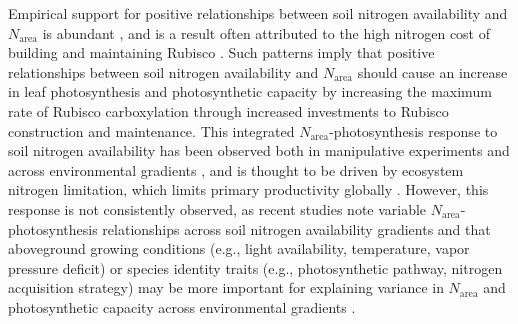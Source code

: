 Empirical support for positive relationships between soil nitrogen availability and $N_\mathrm{area}$ is abundant , and is a result often attributed to the high nitrogen cost of building and maintaining Rubisco . Such patterns imply that positive relationships between soil nitrogen availability and $N_\mathrm{area}$ should cause an increase in leaf photosynthesis and photosynthetic capacity by increasing the maximum rate of Rubisco carboxylation through increased investments to Rubisco construction and maintenance. This integrated $N_\mathrm{area}$-photosynthesis response to soil nitrogen availability has been observed both in manipulative experiments and across environmental gradients , and is thought to be driven by ecosystem nitrogen limitation, which limits primary productivity globally . However, this response is not consistently observed, as recent studies note variable $N_\mathrm{area}$-photosynthesis relationships across soil nitrogen availability gradients  and that aboveground growing conditions (e.g., light availability, temperature, vapor pressure deficit) or species identity traits (e.g., photosynthetic pathway, nitrogen acquisition strategy) may be more important for explaining variance in $N_\mathrm{area}$ and photosynthetic capacity across environmental gradients .

